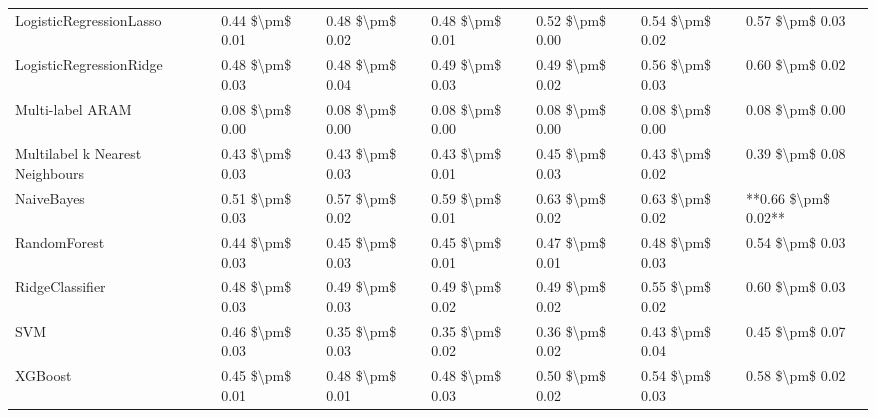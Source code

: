 \begin{tabular}{lllllll}
        LogisticRegressionLasso & 0.44 \$\textbackslash pm\$ 0.01 &           0.48 \$\textbackslash pm\$ 0.02 &       0.48 \$\textbackslash pm\$ 0.01 &        0.52 \$\textbackslash pm\$ 0.00 &                         0.54 \$\textbackslash pm\$ 0.02 &     0.57 \$\textbackslash pm\$ 0.03 \\
        LogisticRegressionRidge & 0.48 \$\textbackslash pm\$ 0.03 &           0.48 \$\textbackslash pm\$ 0.04 &       0.49 \$\textbackslash pm\$ 0.03 &        0.49 \$\textbackslash pm\$ 0.02 &                         0.56 \$\textbackslash pm\$ 0.03 &     0.60 \$\textbackslash pm\$ 0.02 \\
               Multi-label ARAM & 0.08 \$\textbackslash pm\$ 0.00 &           0.08 \$\textbackslash pm\$ 0.00 &       0.08 \$\textbackslash pm\$ 0.00 &        0.08 \$\textbackslash pm\$ 0.00 &                         0.08 \$\textbackslash pm\$ 0.00 &     0.08 \$\textbackslash pm\$ 0.00 \\
Multilabel k Nearest Neighbours & 0.43 \$\textbackslash pm\$ 0.03 &           0.43 \$\textbackslash pm\$ 0.03 &       0.43 \$\textbackslash pm\$ 0.01 &        0.45 \$\textbackslash pm\$ 0.03 &                         0.43 \$\textbackslash pm\$ 0.02 &     0.39 \$\textbackslash pm\$ 0.08 \\
                     NaiveBayes & 0.51 \$\textbackslash pm\$ 0.03 &           0.57 \$\textbackslash pm\$ 0.02 &       0.59 \$\textbackslash pm\$ 0.01 &        0.63 \$\textbackslash pm\$ 0.02 &                         0.63 \$\textbackslash pm\$ 0.02 & **0.66 \$\textbackslash pm\$ 0.02** \\
                   RandomForest & 0.44 \$\textbackslash pm\$ 0.03 &           0.45 \$\textbackslash pm\$ 0.03 &       0.45 \$\textbackslash pm\$ 0.01 &        0.47 \$\textbackslash pm\$ 0.01 &                         0.48 \$\textbackslash pm\$ 0.03 &     0.54 \$\textbackslash pm\$ 0.03 \\
                RidgeClassifier & 0.48 \$\textbackslash pm\$ 0.03 &           0.49 \$\textbackslash pm\$ 0.03 &       0.49 \$\textbackslash pm\$ 0.02 &        0.49 \$\textbackslash pm\$ 0.02 &                         0.55 \$\textbackslash pm\$ 0.02 &     0.60 \$\textbackslash pm\$ 0.03 \\
                            SVM & 0.46 \$\textbackslash pm\$ 0.03 &           0.35 \$\textbackslash pm\$ 0.03 &       0.35 \$\textbackslash pm\$ 0.02 &        0.36 \$\textbackslash pm\$ 0.02 &                         0.43 \$\textbackslash pm\$ 0.04 &     0.45 \$\textbackslash pm\$ 0.07 \\
                        XGBoost & 0.45 \$\textbackslash pm\$ 0.01 &           0.48 \$\textbackslash pm\$ 0.01 &       0.48 \$\textbackslash pm\$ 0.03 &        0.50 \$\textbackslash pm\$ 0.02 &                         0.54 \$\textbackslash pm\$ 0.03 &     0.58 \$\textbackslash pm\$ 0.02 \\
\bottomrule
\end{tabular}
